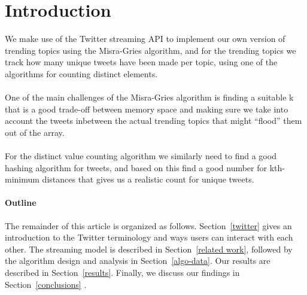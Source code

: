 \section{Introduction}
\label{intro}
We make use of the Twitter streaming API to implement our own version of trending topics using the Misra-Gries algorithm, and for the trending topics we track how many unique tweets have been made per topic, using one of the algorithms for counting distinct elements. 
\\\\
One of the main challenges of the Misra-Gries algorithm is finding a suitable k that is a good trade-off between memory space and making sure we take into account the tweets inbetween the actual trending topics that might ``flood'' them out of the array.
\\\\
For the distinct value counting algorithm we similarly need to find a good hashing algorithm for tweets, and based on this find a good number for kth-minimum distances that gives us a realistic count for unique tweets.

\paragraph{Outline}
The remainder of this article is organized as follows.
Section~\ref{twitter} gives an introduction to the Twitter terminology and ways users can interact with each other. The streaming model is described in Section~\ref{related work}, followed by the algorithm design and analysis in Section~\ref{algo-data}. Our results are described in Section~\ref{results}. Finally, we discuss our findings in Section~\ref{conclusions} .
